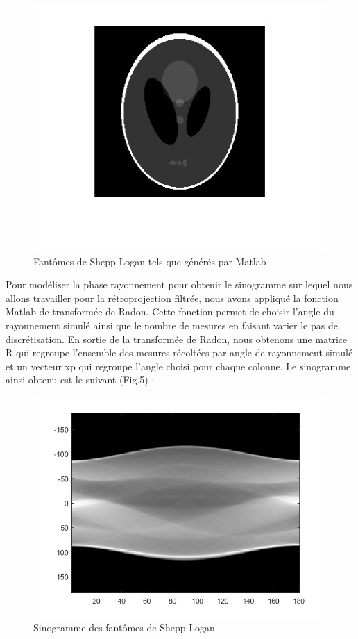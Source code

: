 \documentclass[conference]{IEEEtran}
\begin{document}
\begin{figure}[H]
\centering
\includegraphics[scale=0.7]{Shepp-logan}
\caption[Fantômes de Shepp-Logan tels que générés par Matlab]{Fantômes de Shepp-Logan tels que générés par Matlab}
\label{fig:gallery}
\end{figure}

Pour modéliser la phase rayonnement pour obtenir le sinogramme sur lequel nous allons travailler pour la rétroprojection filtrée, nous avons appliqué la fonction Matlab de transformée de Radon. Cette fonction permet de choisir l'angle du rayonnement simulé ainsi que le nombre de mesures en faisant varier le pas de discrétisation.
En sortie de la transformée de Radon, nous obtenons une matrice R qui regroupe l'ensemble des mesures récoltées par angle de rayonnement simulé et un vecteur xp qui regroupe l'angle choisi pour chaque colonne. Le sinogramme ainsi obtenu est le suivant (Fig.5) :

\begin{figure}[H]
\centering
\includegraphics[scale=0.5]{sinogramme}
\caption[Sinogramme des fantômes de Shepp-Logan]{Sinogramme des fantômes de Shepp-Logan}
\label{fig:gallery}
\end{figure}
\end{document}
